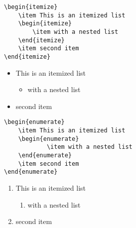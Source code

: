 \documentclass[12pt,a4paper]{article}
\begin{document}
\begin{verbatim}
\begin{itemize}
	\item This is an itemized list
	\begin{itemize}
		\item with a nested list
	\end{itemize}
	\item second item
\end{itemize}
\end{verbatim}
\begin{itemize}
	\item This is an itemized list
	\begin{itemize}
		\item with a nested list
	\end{itemize}
	\item second item
\end{itemize}

\begin{verbatim}
\begin{enumerate}
	\item This is an itemized list
	\begin{enumerate}
			\item with a nested list
	\end{enumerate}
	\item second item
\end{enumerate}
\end{verbatim}
\begin{enumerate}
	\item This is an itemized list
	\begin{enumerate}
			\item with a nested list
	\end{enumerate}
	\item second item
\end{enumerate}
\end{document}
